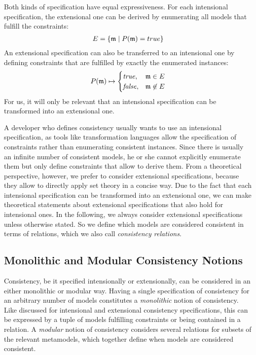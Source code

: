 Both kinds of specification have equal expressiveness. For each intensional specification, the extensional one can be derived by enumerating all models that fulfill the constraints:
\begin{align*}
    E = \setted{\modeltuple{m} \mid P(\modeltuple{m}) = true}
\end{align*}
An extensional specification can also be transferred to an intensional one by defining constraints that are fulfilled by exactly the enumerated instances:
\begin{align*}
    P(\modeltuple{m}) \mapsto 
    \begin{cases} 
        \truemath, & \modeltuple{m} \in E\\
        \falsemath, & \modeltuple{m} \not\in E\\
    \end{cases}
\end{align*}
For us, it will only be relevant that an intensional specification can be transformed into an extensional one.

A developer who defines consistency usually wants to use an intensional specification, as tools like transformation languages allow the specification of constraints rather than enumerating consistent instances.
Since there is usually an infinite number of consistent models, he or she cannot explicitly enumerate them but only define constraints that allow to derive them.
From a theoretical perspective, however, we prefer to consider extensional specifications, because they allow to directly apply set theory in a concise way.
Due to the fact that each intensional specification can be transformed into an extensional one, we can make theoretical statements about extensional specifications that also hold for intensional ones.
In the following, we always consider extensional specifications unless otherwise stated.
So we define which models are considered consistent in terms of relations, which we also call \emph{consistency relations}.


\subsection{Monolithic and Modular Consistency Notions}
\label{chap:correctness:notions_consistency:monolithic_modular}

Consistency, be it specified intensionally or extensionally, can be considered in an either monolithic or modular way.
Having a single specification of consistency for an arbitrary number of models constitutes a \emph{monolithic} notion of consistency.
Like discussed for intensional and extensional consistency specifications, this can be expressed by a tuple of models fulfilling constraints or being contained in a relation.
A \emph{modular} notion of consistency considers several relations for subsets of the relevant metamodels, which together define when models are considered consistent.


